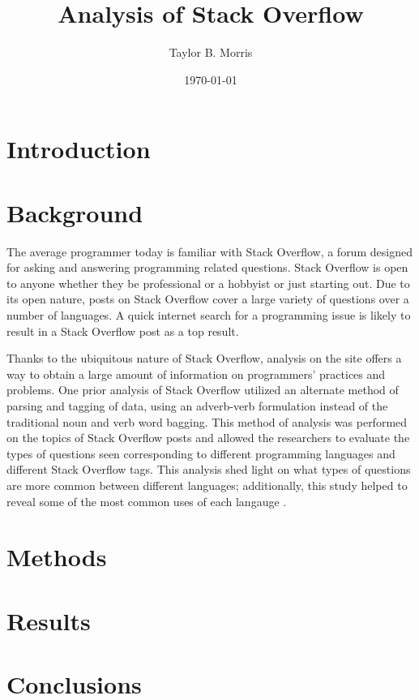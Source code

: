 \documentclass{article}
\author{Taylor B. Morris}
\title{Analysis of Stack Overflow}
\date{\today}
\begin{document}
\maketitle
\begin{abstract}
\end{abstract}
\section{Introduction}
\section{Background}
The average programmer today is familiar with Stack Overflow, a forum
designed for asking and answering programming related questions. Stack
Overflow is open to anyone whether they be professional or a hobbyist or
just starting out. Due to its open nature, posts on Stack Overflow cover
a large variety of questions over a number of languages. A quick internet
search for a programming issue is likely to result in a Stack Overflow post
as a top result.

Thanks to the ubiquitous nature of Stack Overflow, analysis on the site
offers a way to obtain a large amount of information on programmers'
practices and problems. One prior analysis of Stack Overflow utilized an 
alternate method of parsing and tagging of data, using an adverb-verb 
formulation instead of the traditional noun and verb word bagging. This 
method of analysis was performed on the topics of Stack Overflow posts and 
allowed the researchers to evaluate the types of questions seen 
corresponding to different programming languages and different Stack 
Overflow tags. This analysis shed light on what types of questions are more 
common between different languages; additionally, this study helped to 
reveal some of the most common uses of each langauge \cite{allamanis2013and}.

\section{Methods}
\section{Results}
\section{Conclusions}

 
\end{document}
